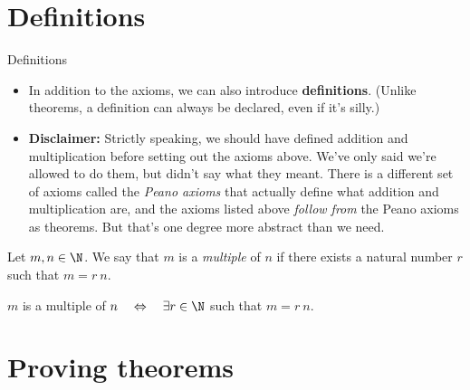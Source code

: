 \documentclass[11pt,aspectratio=1610,handout]{beamer}
\begin{document}
\section{Definitions}


\begin{frame}{Definitions}
	\begin{itemize}\itemsep2mm
		\item In addition to the axioms, we can also introduce \textbf{definitions}. (Unlike theorems, a definition can always be declared, even if it's silly.) \p
		
		\item \textbf{Disclaimer:} Strictly speaking, we should have defined addition and multiplication before setting out the axioms above. We've only said we're allowed to do them, but didn't say what they meant. There is a different set of axioms called the \emph{Peano axioms} that actually define what addition and multiplication are, and the axioms listed above \emph{follow from} the Peano axioms as theorems. But that's one degree more abstract than we need. 
	\end{itemize} \p
	\vspace{2mm}
	
	
	\begin{definition}[Multiple]
		Let $m, n \in \N$. We say that $m$ is a \emph{multiple} of $n$ if there exists a natural number $r$ such that $m = r~n$. 
		\begin{center}
			$m$ is a multiple of $n \quad \Leftrightarrow \quad \exists r \in \N$ such that  $m = r ~n$. 
		\end{center}
	\end{definition}
	
	
\end{frame}


\section{Proving theorems}
\end{document}
